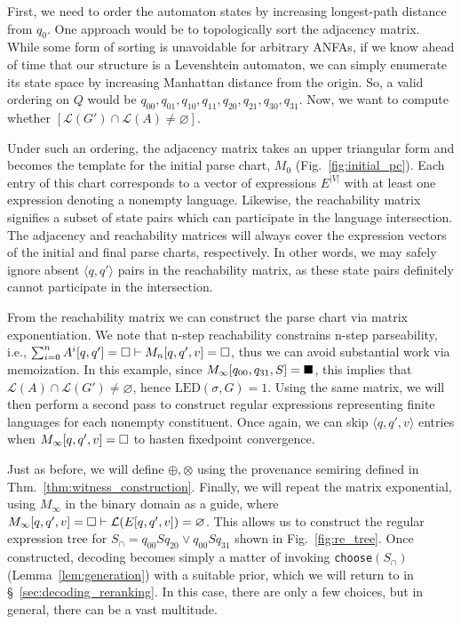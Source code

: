 \documentclass[popl.tex]{subfiles}
\begin{document}
First, we need to order the automaton states by increasing longest-path distance from $q_0$. One approach would be to topologically sort the adjacency matrix. While some form of sorting is unavoidable for arbitrary ANFAs, if we know ahead of time that our structure is a Levenshtein automaton, we can simply enumerate its state space by increasing Manhattan distance from the origin. %
So, a valid ordering on $Q$ would be $q_{00}, q_{01}, q_{10}, q_{11}, q_{20}, q_{21}, q_{30}, q_{31}$. Now, we want to compute whether $[\mathcal{L}(G')\cap \mathcal{L}(A) \neq \varnothing]$.

Under such an ordering, the adjacency matrix takes an upper triangular form and becomes the template for the initial parse chart, $M_0$ (Fig.~\ref{fig:initial_pc}). Each entry of this chart corresponds to a vector of expressions $E^{|V|}$ with at least one expression denoting a nonempty language. Likewise, the reachability matrix signifies a subset of state pairs which can participate in the language intersection. The adjacency and reachability matrices will always cover the expression vectors of the initial and final parse charts, respectively. In other words, we may safely ignore absent $\langle q, q'\rangle$ pairs in the reachability matrix, as these state pairs definitely cannot participate in the intersection.

From the reachability matrix we can construct the parse chart via matrix exponentiation. We note that n-step reachability constrains n-step parseability, i.e., $\sum_{i=0}^n A^i[q, q'] = \square \vdash M_n[q, q', v] = \square$, thus we can avoid substantial work via memoization. In this example, since $M_\infty[q_{00}, q_{31}, S] = \blacksquare$, this implies that $\mathcal{L}(A)\cap \mathcal{L}(G') \neq \varnothing$, hence $\text{LED}(\sigma, G) = 1$. Using the same matrix, we will then perform a second pass to construct regular expressions representing finite languages for each nonempty constituent. Once again, we can skip $\langle q, q', v\rangle$ entries when $M_\infty[q, q', v] = \square$ to hasten fixedpoint convergence.

\enlargethispage{4\baselineskip}
Just as before, we will define $\oplus, \otimes$ using the provenance semiring defined in Thm.~\ref{thm:witness_construction}. Finally, we will repeat the matrix exponential, using $M_\infty$ in the binary domain as a guide, where $M_\infty[q, q', v] = \square \vdash \mathcal{L}(E[q, q', v]) = \varnothing$. This allows us to construct the regular expression tree for $S_\cap = q_{00}Sq_{20}\vee q_{00}Sq_{31}$ shown in Fig.~\ref{fig:re_tree}. Once constructed, decoding becomes simply a matter of invoking \texttt{choose}$(S_\cap)$ (Lemma~\ref{lem:generation}) with a suitable prior, which we will return to in \S~\ref{sec:decoding_reranking}. In this case, there are only a few choices, but in general, there can be a vast multitude.

\clearpage
\ifSubfilesClassLoaded{\par\clearpage}{}
\end{document}
